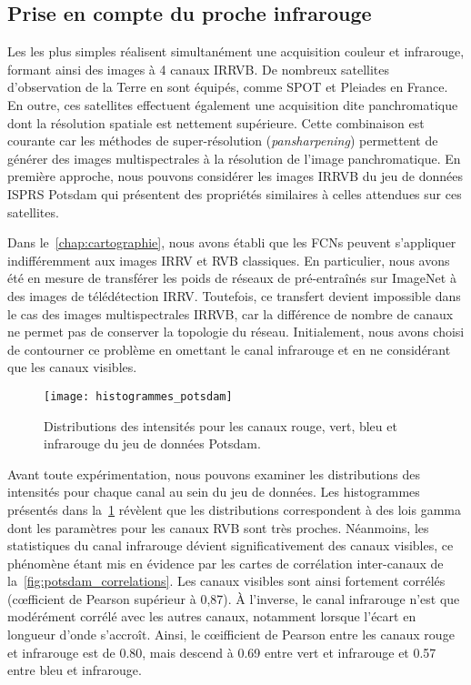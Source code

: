 \subsection{Prise en compte du proche infrarouge}

Les  les plus simples réalisent simultanément une acquisition couleur et infrarouge, formant ainsi des images à 4 canaux \gls{IRRVB}.
De nombreux satellites d'observation de la Terre en sont équipés, comme \gls{SPOT} et \gls{Pleiades} en France. En outre, ces satellites effectuent également une acquisition dite panchromatique dont la résolution spatiale est nettement supérieure. Cette combinaison est courante car les méthodes de super-résolution (\emph{pansharpening}) permettent de générer des images multispectrales à la résolution de l'image panchromatique. En première approche, nous pouvons considérer les images \gls{IRRVB} du jeu de données \gls{ISPRS} Potsdam qui présentent des propriétés similaires à celles attendues sur ces satellites.

Dans le~\cref{chap:cartographie}, nous avons établi que les \glspl{FCN} peuvent s'appliquer indifféremment aux images \gls{IRRV} et \gls{RVB} classiques. En particulier, nous avons été en mesure de transférer les poids de réseaux de pré-entraînés sur ImageNet à des images de télédétection \gls{IRRV}. Toutefois, ce transfert devient impossible dans le cas des images multispectrales \gls{IRRVB}, car la différence de nombre de canaux ne permet pas de conserver la topologie du réseau. Initialement, nous avons choisi de contourner ce problème en omettant le canal infrarouge et en ne considérant que les canaux visibles.

\begin{figure}[h]
  \texttt{[image: histogrammes\_potsdam]}
  \caption{Distributions des intensités pour les canaux rouge, vert, bleu et infrarouge du jeu de données  Potsdam.}
  \label{fig:potsdam_histograms}
\end{figure}

Avant toute expérimentation, nous pouvons examiner les distributions des intensités pour chaque canal au sein du jeu de données. Les histogrammes présentés dans la~\cref{fig:potsdam_histograms} révèlent que les distributions correspondent à des lois gamma dont les paramètres pour les canaux \gls{RVB} sont très proches. Néanmoins, les statistiques du canal infrarouge dévient significativement des canaux visibles, ce phénomène étant mis en évidence par les cartes de corrélation inter-canaux de la~\cref{fig:potsdam_correlations}. Les canaux visibles sont ainsi fortement corrélés (c\oe{}fficient de Pearson supérieur à 0,87). À l'inverse, le canal infrarouge n'est que modérément corrélé avec les autres canaux, notamment lorsque l'écart en longueur d'onde s'accroît. Ainsi, le c\oe{}ifficient de Pearson entre les canaux rouge et infrarouge est de \num{0,80}, mais descend à \num{0,69} entre vert et infrarouge et \num{0,57} entre bleu et infrarouge.

